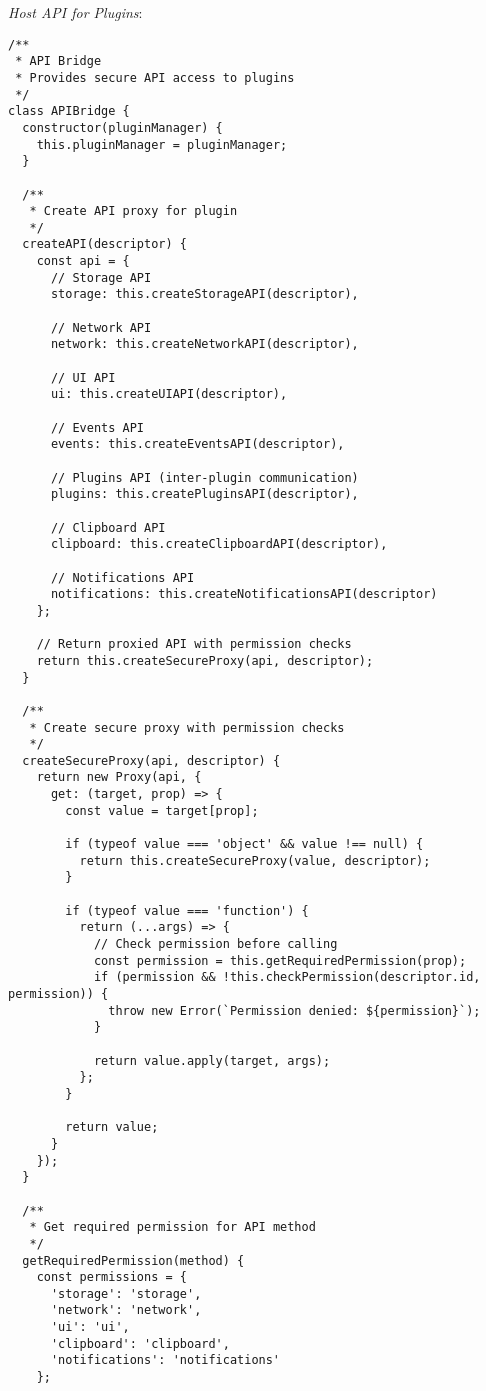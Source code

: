 \documentclass[11pt]{article}
\begin{document}
\emph{Host API for Plugins}:

\begin{verbatim}
/**
 * API Bridge
 * Provides secure API access to plugins
 */
class APIBridge {
  constructor(pluginManager) {
    this.pluginManager = pluginManager;
  }
  
  /**
   * Create API proxy for plugin
   */
  createAPI(descriptor) {
    const api = {
      // Storage API
      storage: this.createStorageAPI(descriptor),
      
      // Network API
      network: this.createNetworkAPI(descriptor),
      
      // UI API
      ui: this.createUIAPI(descriptor),
      
      // Events API
      events: this.createEventsAPI(descriptor),
      
      // Plugins API (inter-plugin communication)
      plugins: this.createPluginsAPI(descriptor),
      
      // Clipboard API
      clipboard: this.createClipboardAPI(descriptor),
      
      // Notifications API
      notifications: this.createNotificationsAPI(descriptor)
    };
    
    // Return proxied API with permission checks
    return this.createSecureProxy(api, descriptor);
  }
  
  /**
   * Create secure proxy with permission checks
   */
  createSecureProxy(api, descriptor) {
    return new Proxy(api, {
      get: (target, prop) => {
        const value = target[prop];
        
        if (typeof value === 'object' && value !== null) {
          return this.createSecureProxy(value, descriptor);
        }
        
        if (typeof value === 'function') {
          return (...args) => {
            // Check permission before calling
            const permission = this.getRequiredPermission(prop);
            if (permission && !this.checkPermission(descriptor.id, permission)) {
              throw new Error(`Permission denied: ${permission}`);
            }
            
            return value.apply(target, args);
          };
        }
        
        return value;
      }
    });
  }
  
  /**
   * Get required permission for API method
   */
  getRequiredPermission(method) {
    const permissions = {
      'storage': 'storage',
      'network': 'network',
      'ui': 'ui',
      'clipboard': 'clipboard',
      'notifications': 'notifications'
    };
    

\end{verbatim}
\end{document}
